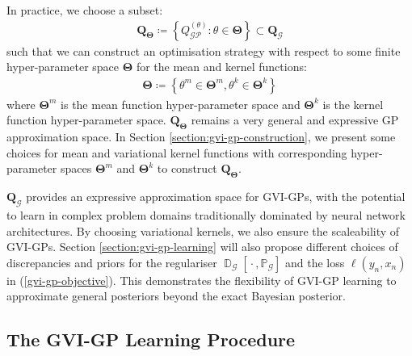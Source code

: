 \documentclass{article}
\newcommand{\D}{\operatorname{\mathbb{D}}}
\newcommand{\GP}{\operatorname{\mathcal{GP}}}
\newcommand{\wc}{\operatorname{{}\cdot{}}}
\numberwithin{equation}{section}
\begin{document}
In practice, we choose a subset:
\begin{align}
    \boldsymbol{Q}_{\boldsymbol{\Theta}} \coloneqq \left\{
    Q^{(\theta)}_{\GP}: \theta \in \boldsymbol{\Theta}
    \right\} \subset \boldsymbol{Q}_{\mathcal{G}}
\end{align}
such that we can construct an optimisation strategy with respect to some finite hyper-parameter space $\boldsymbol{\Theta}$ for the mean and kernel functions:
\begin{align}
    \boldsymbol{\Theta} \coloneqq \left\{\theta^m \in \boldsymbol{\Theta}^m, \theta^k \in \boldsymbol{\Theta}^k \right\}
\end{align}
where $\boldsymbol{\Theta}^m$ is the mean function hyper-parameter space and $\boldsymbol{\Theta}^k$ is the kernel function hyper-parameter space. $\boldsymbol{Q}_{\boldsymbol{\Theta}}$ remains a very general and expressive GP approximation space.
In Section \ref{section:gvi-gp-construction}, we present some choices for mean and variational kernel functions with corresponding hyper-parameter spaces $\boldsymbol{\Theta}^m$ and $\boldsymbol{\Theta}^k$ to construct $\boldsymbol{Q}_{\boldsymbol{\Theta}}$.

$\boldsymbol{Q}_{\mathcal{G}}$ provides an expressive approximation space for GVI-GPs, with the potential to learn in complex problem domains traditionally dominated by neural network architectures.
By choosing variational kernels, we also ensure the scaleability of GVI-GPs.
Section \ref{section:gvi-gp-learning} will also propose different choices of discrepancies and priors for the regulariser $\D_{\mathcal{G}}\left[\wc, \mathbb{P}_{\mathcal{G}}\right]$ and the loss $\ell(y_n, x_n)$ in (\ref{gvi-gp-objective}). This demonstrates the flexibility of GVI-GP learning to approximate general posteriors beyond the exact Bayesian posterior.

\subsection{The GVI-GP Learning Procedure}
\end{document}
